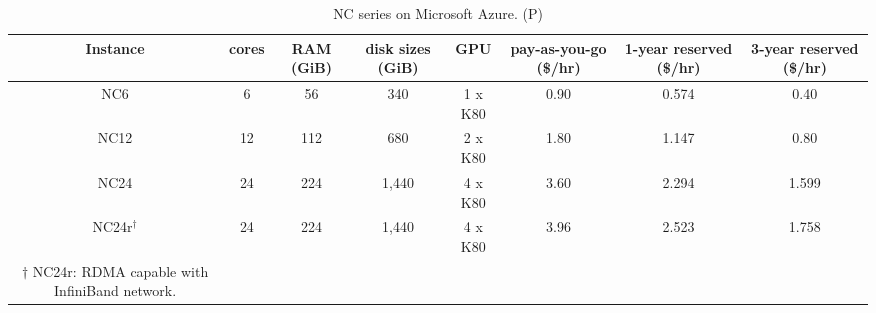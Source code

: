 \begin{table*}
\caption{\label{tab:table}NC series on Microsoft Azure. (P)}
\begin{center}
\begin{tabular}{cccccccc}
Instance & cores & RAM (GiB) & disk sizes (GiB) & GPU & pay-as-you-go (\$/hr) & 1-year reserved (\$/hr) & 3-year reserved (\$/hr) \\
\hline
NC6 & 6 & 56 & 340 & 1 x K80 & 0.90 & 0.574 & 0.40 \\
NC12 & 12 & 112 & 680 & 2 x K80 & 1.80 & 1.147 & 0.80 \\
NC24 & 24 & 224 & 1,440 & 4 x K80 & 3.60 & 2.294 & 1.599 \\
NC24r$^\dagger$ & 24 & 224 & 1,440 & 4 x K80 & 3.96 & 2.523 & 1.758 \\
\hline
$\dagger$ NC24r: RDMA capable with InfiniBand network.
\end{tabular}
\end{center}
\end{table*}